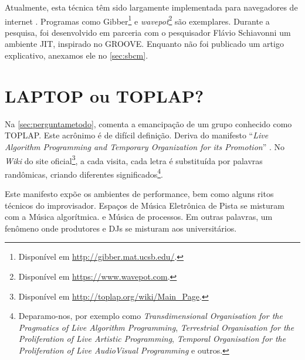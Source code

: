 Atualmente, esta técnica têm sido largamente implementada para navegadores de internet \cite{roberts_web_2013}. Programas como Gibber\footnote{Disponível em \url{http://gibber.mat.ucsb.edu/}.} \cite{roberts_gibber:_2012} e \emph{wavepot}\footnote{Disponível em \url{https://www.wavepot.com}.} são exemplares. Durante a pesquisa, foi desenvolvido em parceria com o pesquisador Flávio Schiavonni um ambiente JIT, inspirado no GROOVE. Enquanto não foi publicado um artigo explicativo, anexamos ele no \autoref{sec:sbcm}.

\section{LAPTOP ou TOPLAP?}\label{sec:laptoptoplap}

Na \autoref{sec:perguntametodo},  comenta a emancipação de um grupo conhecido como TOPLAP. Este acrônimo é de difícil definição. Deriva  do manifesto ``\emph{Live Algorithm Programming and Temporary Organization for its Promotion}'' . No \emph{Wiki} do site oficial\footnote{Disponível em \url{http://toplap.org/wiki/Main_Page}.}, a cada visita, cada letra é substituída por palavras randômicas, criando diferentes significados\footnote{Deparamo-nos, por exemplo como \emph{Transdimensional Organisation for the Pragmatics of Live Algorithm Programming}, \emph{Terrestrial Organisation for the Proliferation of Live Artistic Programming}, \emph{Temporal Organisation for the Proliferation of Live AudioVisual Programming} e outros.}.

Este manifesto expõe os ambientes de performance, bem como alguns ritos técnicos do improvisador.  Espaços de Música Eletrônica de Pista se misturam com a Música algorítmica. e Música de processos. Em outras palavras, um fenômeno onde produtores e DJs se misturam aos universitários.

